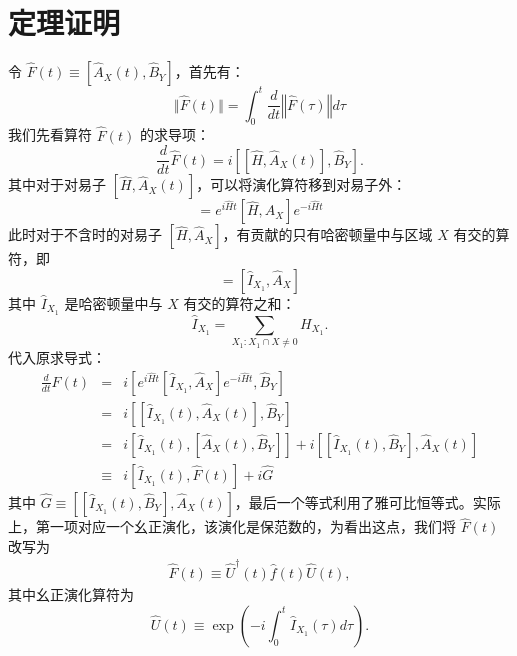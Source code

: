 \documentclass[10pt,UTF8]{ctexart}
\begin{document}
\section*{定理证明}
\noindent
令 $\hat F(t) \equiv [\hat A_X(t),\hat B_Y] $，首先有：
\begin{equation}
	\Vert \hat{F}(t) \Vert = \int_0^t \frac{d}{dt} \left\Vert \hat{F}(\tau) \right\Vert d\tau
\end{equation}
我们先看算符 $\hat F(t)$ 的求导项：
\begin{equation}
	\frac{d}{dt} \hat{F}(t) = i \left[[\hat H, \hat A_X(t)], \hat B_Y \right].
\end{equation}
其中对于对易子 $[\hat H, \hat A_X(t)]$，可以将演化算符移到对易子外：
\begin{equation}
	[\hat H, \hat A_X(t)] = e^{i \hat H t} [\hat H, \hat A_X] e^{-i \hat H t}
\end{equation}
此时对于不含时的对易子 $[\hat H, \hat A_X]$，有贡献的只有哈密顿量中与区域 $X$ 有交的算符，即
\begin{equation}
	[\hat H, \hat A_X] = [\hat I_{X_1}, \hat A_X]
\end{equation}
其中 $\hat I_{X_1}$ 是哈密顿量中与 $X$ 有交的算符之和：
\begin{equation}
	\hat I_{X_1} = \sum_{X_1:X_1 \cap X \ne 0} H_{X_1}.
\end{equation}
代入原求导式：
\begin{eqnarray}
	\frac{d}{dt}\hat{F}(t)
	&=& i\left[e^{i\hat{H}t} \left[\hat I_{X_1}, \hat A_X \right] e^{-i \hat{H} t}, \hat B_Y \right] \nonumber \\
	&=& i\left[ \left[\hat I_{X_1}(t), \hat A_X(t) \right], \hat B_Y \right] \nonumber \\
	&=& i\left[\hat I_{X_1}(t), [\hat A_X(t), \hat B_Y] \right] + i\left[[\hat I_{X_1}(t), \hat B_Y], \hat A_X(t) \right] \nonumber \\
	&\equiv & i\left[\hat I_{X_1}(t), \hat{F}(t) \right] + i\hat{G}
\end{eqnarray}
其中 $\hat{G} \equiv \left[[\hat I_{X_1}(t), \hat B_Y], \hat A_X(t) \right]$，最后一个等式利用了雅可比恒等式。实际上，第一项对应一个幺正演化，该演化是保范数的，为看出这点，我们将 $\hat F(t)$ 改写为
\begin{eqnarray}
	\hat{F}(t) \equiv \hat{U}^{\dagger}(t) \hat{f}(t) \hat{U}(t),
\end{eqnarray}
其中幺正演化算符为
\begin{equation}
	\hat{U}(t) \equiv \exp\left(-i\int_0^t \hat{I}_{X_1}(\tau) d\tau \right).
\end{equation}
\end{document}

